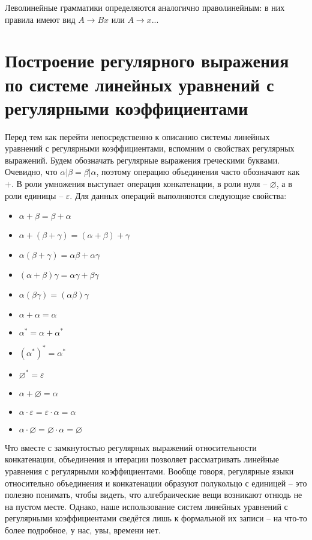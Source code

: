 \documentclass[12pt]{article}
\theoremstyle{definiton}
\theoremstyle{definition}
\theoremstyle{definition}
\let\eps\varepsilon
\begin{document}
Леволинейные грамматики определяются аналогично праволинейным: в них правила имеют вид $A \to Bx $ или $A \to x$...



\section{Построение регулярного выражения по системе линейных уравнений с регулярными коэффициентами}

Перед тем как перейти непосредственно к описанию системы линейных уравнений с регулярными коэффициентами, вспомним о свойствах регулярных выражений. Будем обозначать регулярные выражения греческими буквами. Очевидно, что $\alpha | \beta = \beta | \alpha $, поэтому операцию объединения часто обозначают как $+$. В роли умножения выступает операция конкатенации, в роли нуля -- $\varnothing$, а в роли единицы -- $\eps$. Для данных операций выполняются следующие свойства:
\begin{multicols}{2}
\begin{itemize}
	\item $\alpha + \beta = \beta + \alpha$
	\item $\alpha + (\beta + \gamma) = (\alpha+\beta)+\gamma$
	\item $\alpha(\beta + \gamma) = \alpha\beta + \alpha\gamma$
	\item $(\alpha+\beta)\gamma = \alpha\gamma + \beta\gamma$
	\item $\alpha(\beta\gamma) = (\alpha\beta)\gamma$
	\item $\alpha + \alpha = \alpha$
	\item $\alpha^* = \alpha + \alpha^*$
	\item $(\alpha^*)^* = \alpha^*$
	\item $\varnothing^* = \eps$
	\item $\alpha + \varnothing = \alpha$
	\item $\alpha\cdot\eps = \eps\cdot\alpha = \alpha  $
	\item $\alpha\cdot\varnothing = \varnothing\cdot\alpha =  \varnothing$
\end{itemize}
\end{multicols}

Что вместе с замкнутостью регулярных выражений относительности конкатенации, объединения и итерации позволяет рассматривать линейные уравнения с регулярными коэффициентами. Вообще говоря, регулярные языки относительно объединения и конкатенации образуют полукольцо с единицей -- это полезно понимать, чтобы видеть, что алгебраические вещи возникают отнюдь не на пустом месте. Однако, наше использование систем линейных уравнений с регулярными коэффициентами сведётся лишь к формальной их записи -- на что-то более подробное, у нас, увы, времени нет.
\end{document}
